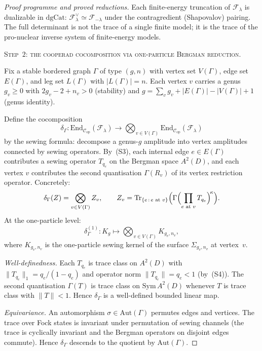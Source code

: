 \documentclass[11pt]{article}
\newcommand{\cC}{\mathcal{C}}
\newcommand{\cF}{\mathcal{F}}
\begin{document}
\begin{proof}[Proof programme and proved reductions]
Each finite-energy truncation of $\cF_\lambda$ is dualizable in
$\mathrm{dgCat}$:
$\cF_\lambda^\vee \simeq \cF_{-\lambda}$ under the contragredient
(Shapovalov) pairing.  The full determinant is not the trace of a
single finite model; it is the trace of the pro-nuclear inverse
system of finite-energy models.

\medskip
\noindent\textsc{Step~$2$: the cooperad cocomposition via
one-particle Bergman reduction.}

Fix a stable bordered graph $\Gamma$ of type $(g,n)$ with
vertex set $V(\Gamma)$, edge set $E(\Gamma)$, and leg set
$L(\Gamma)$ with $|L(\Gamma)| = n$.  Each vertex $v$ carries
a genus $g_v \geq 0$ with $2g_v - 2 + n_v > 0$ (stability)
and $g = \sum_v g_v + |E(\Gamma)| - |V(\Gamma)| + 1$
(genus identity).

Define the cocomposition
\[
  \delta_\Gamma \colon
  \mathrm{End}_{\cC_{\mathrm{op}}}(\cF_\lambda)
  \longrightarrow
  \bigotimes_{v \in V(\Gamma)}
  \mathrm{End}_{\cC_{\mathrm{op}}}(\cF_\lambda)
\]
by the sewing formula: decompose a genus-$g$ amplitude into
vertex amplitudes connected by sewing operators.  By~(S3),
each internal edge $e \in E(\Gamma)$ contributes a sewing
operator $T_{q_e}$ on the Bergman space $A^2(D)$, and each
vertex $v$ contributes the second quantisation $\Gamma(R_v)$
of its vertex restriction operator.  Concretely:
\[
  \delta_\Gamma(Z) = \bigotimes_{v \in V(\Gamma)} Z_v,
  \qquad
  Z_v = \mathrm{Tr}_{\{e\, :\, e \text{ at } v\}}
  \Bigl(\Gamma\Bigl(\prod_{e \text{ at } v} T_{q_e}\Bigr)^{\!\kappa}\Bigr).
\]
At the one-particle level:
\[
  \delta_\Gamma^{(1)} \colon K_g \longmapsto
  \bigotimes_{v \in V(\Gamma)} K_{g_v, n_v},
\]
where $K_{g_v, n_v}$ is the one-particle sewing kernel of
the surface $\Sigma_{g_v, n_v}$ at vertex~$v$.

\emph{Well-definedness.}  Each $T_{q_e}$ is trace class on
$A^2(D)$ with $\|T_{q_e}\|_1 = q_e/(1-q_e)$ and operator norm
$\|T_{q_e}\| = q_e < 1$ (by~(S4)).  The second quantisation
$\Gamma(T)$ is trace class on $\mathrm{Sym}\, A^2(D)$ whenever $T$
is trace class with $\|T\| < 1$.  Hence $\delta_\Gamma$ is a
well-defined bounded linear map.

\emph{Equivariance.}  An automorphism
$\sigma \in \mathrm{Aut}(\Gamma)$ permutes edges and vertices.
The trace over Fock states is invariant under permutation of
sewing channels (the trace is cyclically invariant and the
Bergman operators on disjoint edges commute).  Hence
$\delta_\Gamma$ descends to the quotient by
$\mathrm{Aut}(\Gamma)$.


\end{proof}
\end{document}
